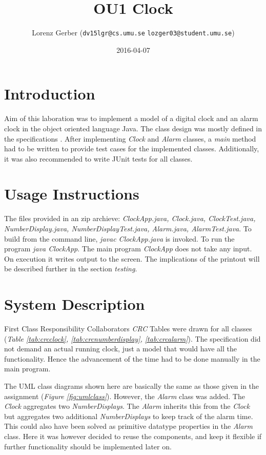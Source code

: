 \documentclass[a4paper,11pt,twoside]{article}
\title{OU1 Clock}
\author{Lorenz Gerber ({\tt{dv15lgr@cs.umu.se}} {\tt{lozger03@student.umu.se}})}
\date{2016-04-07}
\begin{document}
\lstset{language=C}
\maketitle
\thispagestyle{empty}
\newpage

\clearpage
{}

\section{Introduction} 
Aim of this laboration was to implement a model of a digital clock and
an alarm clock in the object oriented language Java. The class design
was mostly defined in the specifications \cite{clock}. After
implementing \textit{Clock} and \textit{Alarm} classes, a
\textit{main} method had to be written to provide test cases for the
implemented classes. Additionally, it was also recommended to write
JUnit tests for all classes.

\section{Usage Instructions}
The files provided in an zip archieve: \textit{ClockApp.java,
  Clock.java, ClockTest.java, NumberDisplay.java,
  NumberDisplayTest.java, Alarm.java, AlarmTest.java}. To build from
the command line, \textit{javac ClockApp.java} is invoked. To run the
program \textit{java ClockApp}. The main program \textit{ClockApp}
does not take any input. On execution it writes output to the
screen. The implications of the printout will be described further in
the section \textit{testing}. 

\section{System Description}
First Class Responsibility Collaborators \textit{CRC} Tables were
drawn for all classes (\textit{Table \ref{tab:crcclock},
\ref{tab:crcnumberdisplay}, \ref{tab:crcalarm}}). The specification
did not demand an actual running clock, just a model that would have
all the functionality. Hence the advancement of the time had to be
done manually in the main program.

The UML class diagrams shown here are basically the same as those
given in the assignment (\textit{Figure \ref{fig:umlclass}}). However,
the \textit{Alarm} class was added. The \textit{Clock} aggregates two
\textit{NumberDisplays}. The \textit{Alarm} inherits this from the
\textit{Clock} but aggregates two additional \textit{NumberDisplays}
to keep track of the alarm time. This could also have been solved as
primitive datatype properties in the \textit{Alarm} class. Here it was
however decided to reuse the components, and keep it flexible if
further functionality should be implemented later on.
\end{document}
